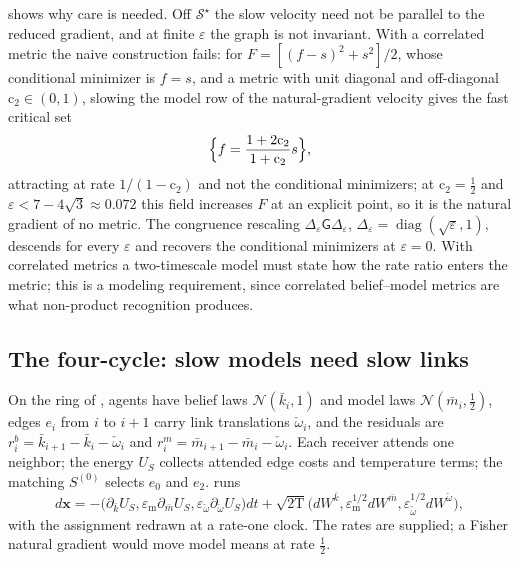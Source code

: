  shows why care is needed. Off $\mathcal S^\star$ the slow
velocity need not be parallel to the reduced gradient, and at finite $\varepsilon$ the graph is not
invariant. With a correlated metric the naive construction fails: for $F=[(f-s)^2+s^2]/2$, whose
conditional minimizer is $f=s$, and a metric with unit diagonal and off-diagonal
$\mathrm c_2\in(0,1)$, slowing the model row of the natural-gradient velocity gives the fast critical
set
\[
\Bigl\{f=\frac{1+2\mathrm c_2}{1+\mathrm c_2}s\Bigr\},
\]
attracting at rate $1/(1-\mathrm c_2)$ and not the conditional minimizers; at $\mathrm c_2=\tfrac12$
and $\varepsilon<7-4\sqrt3\approx0.072$ this field increases $F$ at an explicit point, so it is the
natural gradient of no metric. The congruence rescaling $\Delta_\varepsilon\mathsf G\Delta_\varepsilon$,
$\Delta_\varepsilon=\operatorname{diag}(\sqrt\varepsilon,1)$, descends for every $\varepsilon$ and
recovers the conditional minimizers at $\varepsilon=0$. With correlated metrics a two-timescale model
must state how the rate ratio enters the metric; this is a modeling requirement, since correlated
belief--model metrics are what non-product recognition produces.

\subsection{The four-cycle: slow models need slow links}
\label{comp:ch08-formulas-cycle}

On the ring of , agents have belief laws $\mathcal N(\bar k_i,1)$
and model laws $\mathcal N(\bar m_i,\tfrac12)$, edges $e_i$ from $i$ to $i+1$ carry link translations
$\check\omega_i$, and the residuals are $r^b_i=\bar k_{i+1}-\bar k_i-\check\omega_i$ and
$r^m_i=\bar m_{i+1}-\bar m_i-\check\omega_i$. Each receiver attends one neighbor; the energy $U_S$
collects attended edge costs and temperature terms; the matching $S^{(0)}$ selects $e_0$ and $e_2$.
 runs
\[
d\mathbf x=-\bigl(\partial_{\bar k}U_S,\varepsilon_{\mathrm m}\partial_{\bar m}U_S,
\varepsilon_{\check\omega}\partial_{\check\omega}U_S\bigr)dt
+\sqrt{2\mathrm T}\bigl(dW^{\bar k},\varepsilon_{\mathrm m}^{1/2}dW^{\bar m},
\varepsilon_{\check\omega}^{1/2}dW^{\check\omega}\bigr),
\]
with the assignment redrawn at a rate-one clock. The rates are supplied; a Fisher natural gradient
would move model means at rate $\tfrac12$.

